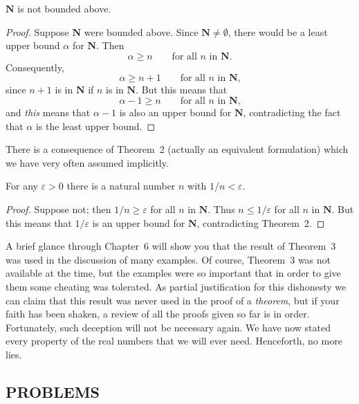 \begin{theorem}
$\mathbf{N}$ is not bounded above.
\end{theorem}

\begin{proof}
Suppose $\mathbf{N}$ were bounded above. Since $\mathbf{N} \neq \emptyset$,
there would be a least upper bound $\alpha$ for $\mathbf{N}$. Then
\[
\alpha \geq n \qquad\text{for all $n$ in $\mathbf{N}$.}
\]
Consequently,
\[
\alpha \geq n + 1 \qquad\text{for all $n$ in $\mathbf{N}$,}
\]
since $n+1$ is in $\mathbf{N}$ if $n$ is in $\mathbf{N}$. But this means that
\[
\alpha - 1 \geq n \qquad\text{for all $n$ in $\mathbf{N}$,}
\]
and \emph{this} means that $\alpha - 1$ is also an upper bound for
$\mathbf{N}$, contradicting the fact that $\alpha$ is the least upper bound.
\end{proof}

There is a consequence of Theorem~2 (actually an equivalent formulation)
which we have very often assumed implicitly.

\begin{theorem}
For any $\varepsilon > 0$ there is a natural number $n$ with $1/n < \varepsilon$.
\end{theorem}

\begin{proof}
Suppose not; then $1/n \geq \varepsilon$ for all $n$ in $\mathbf{N}$. Thus
$n \leq 1/\varepsilon$ for all $n$ in $\mathbf{N}$. But this means that
$1/\varepsilon$ is an upper bound for $\mathbf{N}$, contradicting Theorem~2.
\end{proof}

A brief glance through Chapter~6 will show you that the result of Theorem~3
was used in the discussion of many examples. Of course, Theorem~3 was not
available at the time, but the examples were so important that in order to
give them some cheating was tolerated. As partial justification for this
dishonesty we can claim that this result was never used in the proof of a
\emph{theorem}, but if your faith has been shaken, a review of all the proofs
given so far is in order. Fortunately, such deception will not be necessary
again. We have now stated every property of the real numbers that we will
ever need. Henceforth, no more lies.

\subsection*{PROBLEMS}

